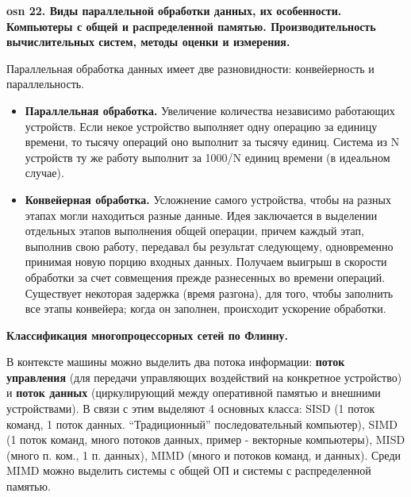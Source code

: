 \setcounter{section}{15}
\setcounter{subsection}{22}
\setcounter{equation}{0}
\textbf{\LARGE osn 22. Виды параллельной обработки данных, их особенности. Компьютеры с общей и распределенной памятью. Производительность вычислительных систем, методы оценки и измерения.}


Параллельная обработка данных имеет две разновидности: конвейерность и параллельность.
\begin{itemize}
    \item \textbf{Параллельная обработка.} Увеличение количества независимо работающих устройств. Если некое устройство выполняет одну операцию за единицу времени, то тысячу операций оно выполнит за тысячу единиц. Система из N устройств ту же работу выполнит за 1000/N единиц времени (в идеальном случае).
    \item \textbf{Конвейерная обработка.} Усложнение самого устройства, чтобы на разных этапах могли находиться разные данные. Идея заключается в выделении отдельных этапов выполнения общей операции, причем каждый этап, выполнив свою работу, передавал бы результат следующему, одновременно принимая новую порцию входных данных. Получаем выигрыш в скорости обработки за счет совмещения прежде разнесенных во времени операций. Существует некоторая задержка (время разгона), для того, чтобы заполнить все этапы конвейера; когда он заполнен, происходит ускорение обработки.
\end{itemize}

\textbf{Классификация многопроцессорных сетей по Флинну.}

В контексте машины можно выделить два потока информации: \textbf{поток управления} (для передачи управляющих воздействий на конкретное устройство) и \textbf{поток данных} (циркулирующий между оперативной памятью и внешними устройствами). В связи с этим выделяют 4 основных класса: SISD (1 поток команд, 1 поток данных. ``Традиционный'' последовательный компьютер), SIMD (1 поток команд, много потоков данных, пример - векторные компьютеры), MISD (много п. ком., 1 п. данных), MIMD (много и потоков команд, и данных). Среди MIMD можно выделить системы с общей ОП и системы с распределенной памятью.

